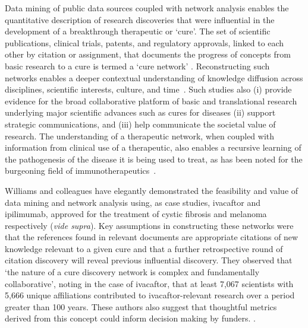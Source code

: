 \documentclass[10pt,letterpaper]{article}
\begin{document}
Data mining of public data sources coupled with network analysis enables the quantitative description of research discoveries that were influential in the development of a breakthrough therapeutic or `cure'.  The set of scientific publications, clinical trials, patents, and regulatory approvals, linked to each other by citation or assignment, that documents the progress of concepts from basic research to a cure is termed a `cure network' \cite {bibWilliams}. Reconstructing such networks enables a deeper contextual understanding of knowledge diffusion across disciplines, scientific interests, culture, and time~\cite{bibMaldame}. Such studies also (i) provide evidence for the broad collaborative platform of basic and translational research underlying major scientific advances such as cures for diseases \cite {bibLauer} (ii) support strategic communications, and (iii) help communicate the societal value of research. The understanding of a therapeutic network, when coupled with information from clinical use of a therapeutic, also enables a recursive learning of the pathogenesis of the disease it is being used to treat, as has been noted for the burgeoning field of immunotherapeutics~\cite{bibChan}.  

Williams and colleagues have elegantly demonstrated the feasibility and value of data mining and network analysis using, as case studies, ivacaftor and ipilimumab, approved for the treatment of cystic fibrosis and melanoma respectively (\textit{vide supra}). Key assumptions in constructing these networks were that the references found in relevant documents are appropriate citations of new knowledge relevant to a given cure and that a further retrospective round of citation discovery will reveal previous influential discovery. They observed that `the nature of a cure discovery network is complex and fundamentally collaborative', noting in the case of ivacaftor, that at least 7,067 scientists with 5,666 unique affiliations contributed to ivacaftor-relevant research over a period greater than 100 years. These authors also suggest that thoughtful metrics derived from this concept could inform decision making by funders. .
\end{document}
